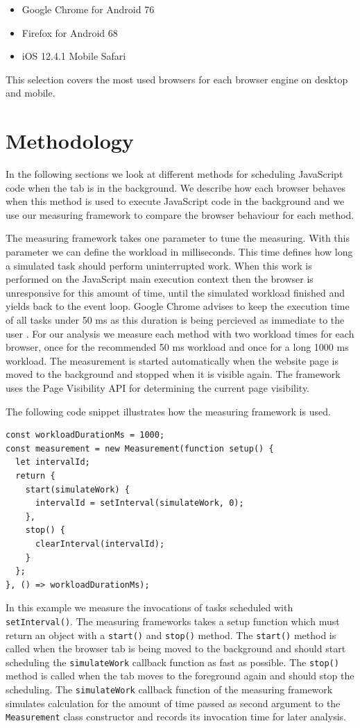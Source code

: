 \documentclass[
	ruledheaders=section,%
	class=report,%
	thesis={type=bachelor},%
	accentcolor=9c,%
	custommargins=true,%
	marginpar=false,%
	parskip=half-,%
	fontsize=11pt,%
]{tudapub}
\begin{document}
  \begin{itemize}
  \item Google Chrome for Android 76
  \item Firefox for Android 68
  \item iOS 12.4.1 Mobile Safari
  \end{itemize}

  This selection covers the most used browsers for each browser engine on desktop and mobile.

  \section{Methodology}

  In the following sections we look at different methods for scheduling JavaScript code when the tab is in the background. We describe how each browser behaves when this method is used to execute JavaScript code in the background and we use our measuring framework to compare the browser behaviour for each method.

  The measuring framework takes one parameter to tune the measuring. With this parameter we can define the workload in milliseconds. This time defines how long a simulated task should perform uninterrupted work. When this work is performed on the JavaScript main execution context then the browser is unresponsive for this amount of time, until the simulated workload finished and yields back to the event loop. Google Chrome advises to keep the execution time of all tasks under 50 ms as this duration is being percieved as immediate to the user \cite{chrome-rail-model}. For our analysis we measure each method with two workload times for each browser, once for the recommended 50 ms workload and once for a long 1000 ms workload. The measurement is started automatically when the website page is moved to the background and stopped when it is visible again. The framework uses the Page Visibility API \cite{mdn-page-visibility} for determining the current page visibility.

  The following code snippet illustrates how the measuring framework is used.
\begin{lstlisting}
const workloadDurationMs = 1000;
const measurement = new Measurement(function setup() {
  let intervalId;
  return {
    start(simulateWork) {
      intervalId = setInterval(simulateWork, 0);
    },
    stop() {
      clearInterval(intervalId);
    }
  };
}, () => workloadDurationMs);
\end{lstlisting}
  In this example we measure the invocations of tasks scheduled with \texttt{setInterval()}. The measuring frameworks takes a setup function which must return an object with a \texttt{start()} and \texttt{stop()} method. The \texttt{start()} method is called when the browser tab is being moved to the background and should start scheduling the \texttt{simulateWork} callback function as fast as possible. The \texttt{stop()} method is called when the tab moves to the foreground again and should stop the scheduling. The \texttt{simulateWork} callback function of the measuring framework simulates calculation for the amount of time passed as second argument to the \texttt{Measurement} class constructor and records its invocation time for later analysis.
\end{document}
